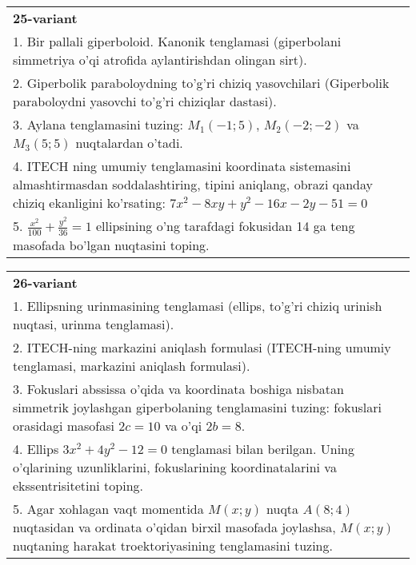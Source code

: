 \documentclass{article}
\begin{document}
\begin{tabular}{m{17cm}}
\textbf{25-variant}\\
1. Bir pallali giperboloid. Kanonik tenglamasi (giperbolani simmetriya o'qi atrofida aylantirishdan olingan sirt).\\

2. Giperbolik paraboloydning to'g'ri chiziq yasovchilari (Giperbolik paraboloydni yasovchi to'g'ri chiziqlar dastasi).\\

3. Aylana tenglamasini tuzing: $M_1(-1;5)$, $M_2(-2;-2)$ va $M_3(5;5)$ nuqtalardan o'tadi.\\

4. ITECH ning umumiy tenglamasini koordinata sistemasini almashtirmasdan soddalashtiring, tipini aniqlang, obrazi qanday chiziq ekanligini ko'rsating: $7x^{2} - 8xy + y^{2} - 16x - 2y - 51 = 0$\\

5. $\frac{x^{2}}{100} + \frac{y^{2}}{36} = 1$ ellipsining o'ng tarafdagi fokusidan 14 ga teng masofada bo'lgan nuqtasini toping.  
\end{tabular}
\vspace{1cm}


\begin{tabular}{m{17cm}}
\textbf{26-variant}\\
1. Ellipsning urinmasining tenglamasi (ellips, to'g'ri chiziq urinish nuqtasi, urinma tenglamasi).\\

2. ITECH-ning markazini aniqlash formulasi (ITECH-ning umumiy tenglamasi, markazini aniqlash formulasi).\\

3. Fokuslari abssissa o'qida va koordinata boshiga nisbatan simmetrik joylashgan giperbolaning tenglamasini tuzing: fokuslari orasidagi masofasi $2c=10$ va o'qi $2b=8$.\\

4. Ellips $3x^{2} + 4y^{2} - 12 = 0$ tenglamasi bilan berilgan. Uning o'qlarining uzunliklarini, fokuslarining koordinatalarini va ekssentrisitetini toping.  \\

5. Agar xohlagan vaqt momentida $M(x;y)$ nuqta $A(8;4)$ nuqtasidan va ordinata o'qidan birxil masofada joylashsa, $M(x;y)$ nuqtaning harakat troektoriyasining tenglamasini tuzing.  
\end{tabular}
\vspace{1cm}
\end{document}

